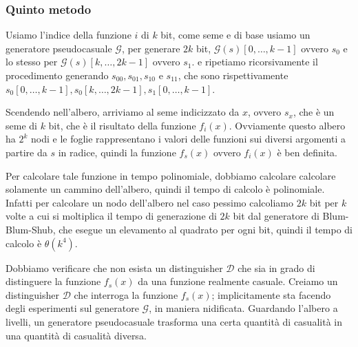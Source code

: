 \subsubsection{Quinto metodo}
Usiamo l'indice della funzione $i$ di $k$ bit, come seme e di base usiamo un 
generatore pseudocasuale $\mathcal{G}$, per generare $2k$ bit,
$\mathcal{G}(s)[0,\dots,k-1]$ ovvero $s_0$ e lo stesso per $\mathcal{G}(s)[k,\dots,2k-1]$
ovvero $s_1$. e ripetiamo ricorsivamente il procedimento generando $s_{00}, s_{01}, s_{10}$
e $s_{11}$, che sono rispettivamente $s_0[0,\dots,k-1], s_0[k,\dots,2k-1], s_1[0,\dots,k-1]$.
\begin{figure}[H]
  \centering
\end{figure}
Scendendo nell'albero, arriviamo al seme indicizzato da $x$, ovvero
$s_x$, che è un seme di $k$ bit, che è il risultato della funzione
$f_i(x)$. Ovviamente questo albero ha $2^k$ nodi e le foglie rappresentano i 
valori delle funzioni sui diversi argomenti a partire da $s$ in radice,
quindi la funzione $f_s(x)$ ovvero $f_i(x)$ è ben definita.

Per calcolare tale funzione in tempo polinomiale, dobbiamo calcolare
calcolare solamente un cammino dell'albero, quindi il tempo di calcolo
è polinomiale. Infatti per calcolare un nodo dell'albero nel caso pessimo 
calcoliamo $2k$ bit per $k$ volte a cui si moltiplica il tempo di generazione 
di $2k$ bit dal generatore di Blum-Blum-Shub, che esegue un elevamento al 
quadrato per ogni bit, quindi il tempo di calcolo è
$\theta(k^4)$.

Dobbiamo verificare che non esista un distinguisher $\mathcal{D}$ che
sia in grado di distinguere la funzione $f_s(x)$ da una funzione
realmente casuale. Creiamo un distinguisher $\mathcal{D}$ che 
interroga la funzione $f_s(x)$; implicitamente sta facendo degli esperimenti
sul generatore $\mathcal{G}$, in maniera nidificata.
Guardando l'albero a livelli, un generatore pseudocasuale trasforma una 
certa quantità di casualità in una quantità di casualità diversa.

